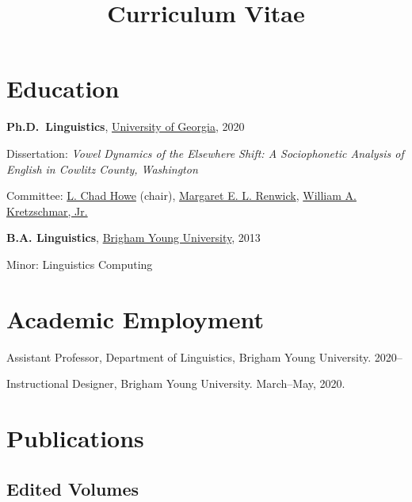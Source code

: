 \documentclass[
]{article}
\title{Curriculum Vitae}
\author{}
\date{}
\begin{document}
\maketitle
\ifdefined\Shaded\renewenvironment{Shaded}{\begin{tcolorbox}[sharp corners, frame hidden, breakable, enhanced, interior hidden, borderline west={3pt}{0pt}{shadecolor}, boxrule=0pt]}{\end{tcolorbox}}\fi

\hypertarget{education}{%
\section{Education}\label{education}}

\textbf{Ph.D.~Linguistics},
\href{http://www.linguistics.uga.edu/}{University of Georgia}, 2020

Dissertation: \emph{Vowel Dynamics of the Elsewhere Shift: A
Sociophonetic Analysis of English in Cowlitz County, Washington}

Committee: \href{https://chadhoweuga.github.io}{L. Chad Howe} (chair),
\href{https://linguistics.uga.edu/directory/people/margaret-e-l-renwick/}{Margaret
E. L. Renwick},
\href{https://www.english.uga.edu/directory/people/william-kretzschmar}{William
A. Kretzschmar, Jr.}

\textbf{B.A. Linguistics}, \href{http://ling.byu.edu/}{Brigham Young
University}, 2013

Minor: Linguistics Computing

\hypertarget{academic-employment}{%
\section{Academic Employment}\label{academic-employment}}

Assistant Professor, Department of Linguistics, Brigham Young
University. 2020--

Instructional Designer, Brigham Young University. March--May, 2020.

\hypertarget{publications}{%
\section{Publications}\label{publications}}

\hypertarget{edited-volumes}{%
\subsection{Edited Volumes}\label{edited-volumes}}
\end{document}
